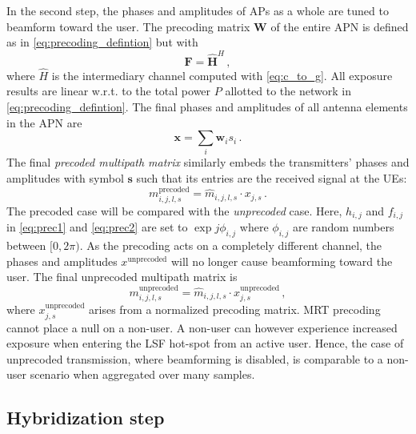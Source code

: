 \documentclass{IEEEtran}
\begin{document}
In the second step, the phases and amplitudes of \glspl{AP} as a whole are tuned to beamform toward the user. The precoding matrix $\mathbf{W}$ of the entire \gls{APN} is defined as in \eqref{eq:precoding_defintion} but with 
\begin{equation}
\label{eq:prec2}
\mathbf{F} = \widehat{\mathbf{H}}^H \, ,
\end{equation}
where $\widehat{H}$ is the intermediary channel computed with \eqref{eq:c_to_g}. All exposure results are linear w.r.t. to the total power $P$ allotted to the network in \eqref{eq:precoding_defintion}. The final phases and amplitudes of all antenna elements in the \gls{APN} are
\begin{equation}
\label{eq:x_final}
    \boldsymbol{x} = \sum_i \mathbf{w}_i s_i \, .
\end{equation}
The final \textit{precoded multipath matrix} similarly embeds the transmitters' phases and amplitudes with symbol $\boldsymbol{s}$ such that its entries are the received signal at the \glspl{UE}: 
\begin{equation}
\label{eq:m_precoded}
    m_{i,j,l,s}^\mathrm{precoded} = \hat{m}_{i,j,l,s} \cdot x_{j,s} \, .
\end{equation}
The precoded case will be compared with the \textit{unprecoded} case. Here, $h_{i,j}$ and $f_{i,j}$ in \eqref{eq:prec1} and \eqref{eq:prec2} are set to $\exp{j\phi_{i,j}}$ where $\phi_{i,j}$ are random numbers between $[0,2\pi)$. As the precoding acts on a completely different channel, the phases and amplitudes $x^\mathrm{unprecoded}$ will no longer cause beamforming toward the user. The final unprecoded multipath matrix is
\begin{equation}
\label{eq:m_unprecoded}
    m_{i,j,l,s}^\mathrm{unprecoded} = \hat{m}_{i,j,l,s} \cdot x_{j,s}^\mathrm{unprecoded} \, ,
\end{equation}
where $x_{j,s}^\mathrm{unprecoded}$ arises from a normalized precoding matrix. \gls{MRT} precoding cannot place a null on a non-user. A non-user can however experience increased exposure when entering the \gls{LSF} hot-spot from an active user. Hence, the case of unprecoded transmission, where beamforming is disabled, is comparable to a non-user scenario when aggregated over many samples.

\subsection{Hybridization step}
\label{sec:hybridization}
\end{document}
